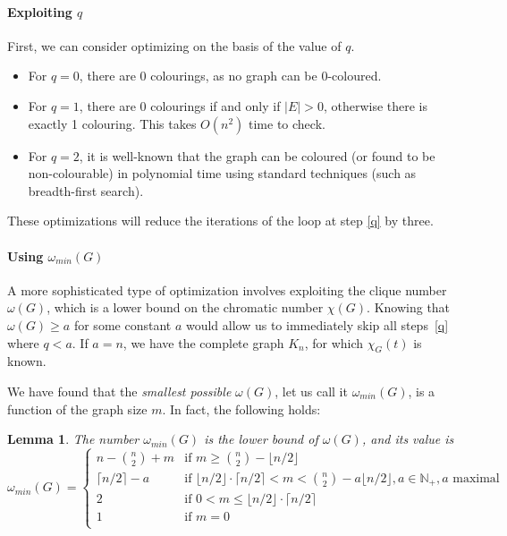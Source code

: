 \documentclass{cslthse-msc}
\newtheorem{lemma}{Lemma}
\begin{document}
\paragraph{Exploiting $q$}
First, we can consider optimizing on the basis of the value of $q$.
\begin{itemize}
\item For $q = 0$, there are 0 colourings, as no graph can be 0-coloured.
\item For $q = 1$, there are 0 colourings if and only if $|E| > 0$, otherwise there is exactly 1 colouring. This takes $O(n^2)$ time to check.
\item For $q = 2$, it is well-known that the graph can be coloured (or found to be non-colourable) in polynomial time using standard techniques (such as breadth-first search).
\end{itemize}

These optimizations will reduce the iterations of the loop at step \ref{q} by three.

\paragraph{Using $\omega_{min}(G)$}\label{omega}
A more sophisticated type of optimization involves exploiting the clique number $\omega(G)$, which is a lower bound on the chromatic number $\chi(G)$. Knowing that $\omega(G) \geq a$ for some constant $a$ would allow us to immediately skip all steps~\ref{q} where $q < a$. If $a = n$, we have the complete graph $K_n$, for which $\chi_G(t)$ is known.

We have found that the \emph{smallest possible} $\omega(G)$, let us call it $\omega_{min}(G)$, is a function of the graph size $m$. In fact, the following holds:

\begin{lemma}\label{lemma1}
The number $\omega_{min}(G)$ is the lower bound of $\omega(G)$, and its value is
\[
\omega_{min}(G) = 
\begin{cases}
	  n - \binom{n}{2} + m & \text{if } m \geq \binom{n}{2} - \lfloor n/2 \rfloor \\
	  \lceil n / 2 \rceil - a & \text{if }  \lfloor n / 2 \rfloor \cdot \lceil n / 2 \rceil < m < \binom{n}{2} - a \lfloor n/2 \rfloor, a \in \mathbb{N}_+, a \text{ maximal} \\
	  2 & \text{if } 0 < m \leq \lfloor n / 2 \rfloor \cdot \lceil n / 2 \rceil \\
	  1 & \text{if } m = 0 \\
\end{cases}
\]
\end{lemma}
\end{document}

